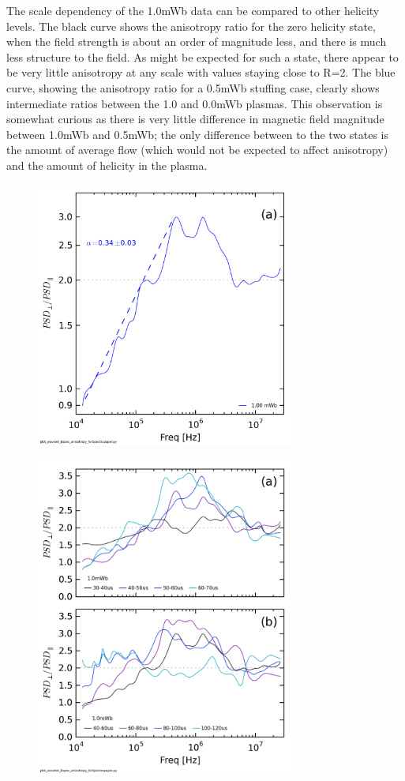 \documentclass[aip,prl,amsmath,amssymb,reprint,superscriptaddress]{revtex4-1} %
\begin{document}
The scale dependency of the 1.0mWb data can be compared to other helicity levels. The black curve shows the anisotropy ratio for the zero helicity state, when the field strength is about an order of magnitude less, and there is much less structure to the field. As might be expected for such a state, there appear to be very little anisotropy at any scale with values staying close to R=2. The blue curve, showing the anisotropy ratio for a 0.5mWb stuffing case, clearly shows intermediate ratios between the 1.0 and 0.0mWb plasmas. This observation is somewhat curious as there is very little difference in magnetic field magnitude between 1.0mWb and 0.5mWb; the only difference between to the two states is the amount of average flow (which would not be expected to affect anisotropy) and the amount of helicity in the plasma.

\begin{figure}[!htbp]
\centerline{
\includegraphics[width=8.5cm]{Bperppara_chan1t4_1mWbspectra_40t60us_AsymRatio_wFit}}
\caption{\label{fig:fitratio}}
\end{figure}

\begin{figure}[!htbp]
\centerline{
\includegraphics[width=8.5cm]{Bperppara_chan1t4_1mWbspectra_timescan}}
\caption{\label{fig:timeratio}}
\end{figure}
\end{document}

